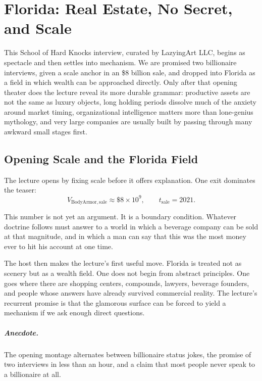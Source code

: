 \chapter{Florida: Real Estate, No Secret, and Scale}

This School of Hard Knocks interview, curated by LazyingArt LLC, begins as spectacle and then settles into mechanism. We are promised two billionaire interviews, given a scale anchor in an \$8 billion sale, and dropped into Florida as a field in which wealth can be approached directly. Only after that opening theater does the lecture reveal its more durable grammar: productive assets are not the same as luxury objects, long holding periods dissolve much of the anxiety around market timing, organizational intelligence matters more than lone-genius mythology, and very large companies are usually built by passing through many awkward small stages first.

\section{Opening Scale and the Florida Field}

The lecture opens by fixing scale before it offers explanation. One exit dominates the teaser:
\begin{equation}
V_{\mathrm{BodyArmor,sale}} \approx \$8\times 10^9,
\qquad
t_{\mathrm{sale}} = 2021.
\end{equation}

This number is not yet an argument. It is a boundary condition. Whatever doctrine follows must answer to a world in which a beverage company can be sold at that magnitude, and in which a man can say that this was the most money ever to hit his account at one time.

The host then makes the lecture's first useful move. Florida is treated not as scenery but as a wealth field. One does not begin from abstract principles. One goes where there are shopping centers, compounds, lawyers, beverage founders, and people whose answers have already survived commercial reality. The lecture's recurrent promise is that the glamorous surface can be forced to yield a mechanism if we ask enough direct questions.

\paragraph{Anecdote.}
The opening montage alternates between billionaire status jokes, the promise of two interviews in less than an hour, and a claim that most people never speak to a billionaire at all.

